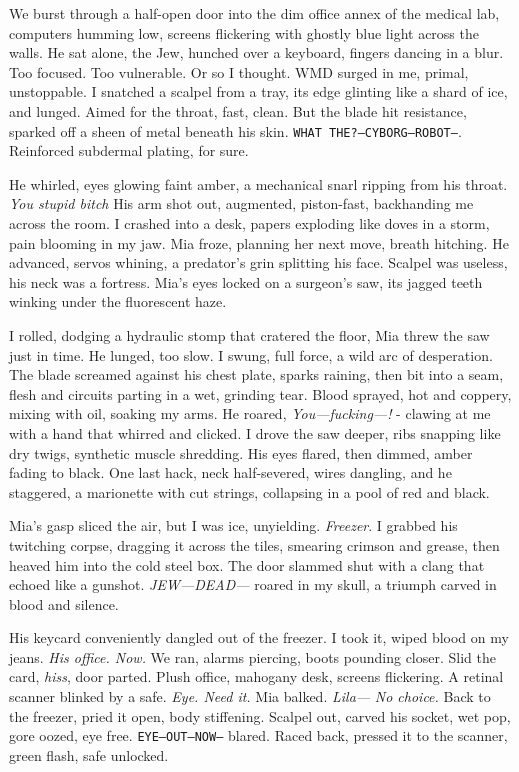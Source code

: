 \documentclass[12pt,oneside]{book}
\newcommand{\note}[1]{\texttt{#1}}
\begin{document}
We burst through a half-open door into the dim office annex of the medical lab, computers humming low, screens flickering with ghostly blue light across the walls. He sat alone, the Jew, hunched over a keyboard, fingers dancing in a blur. Too focused. Too vulnerable. Or so I thought. WMD surged in me, primal, unstoppable. I snatched a scalpel from a tray, its edge glinting like a shard of ice, and lunged. Aimed for the throat, fast, clean. But the blade hit resistance, sparked off a sheen of metal beneath his skin. \note{WHAT THE?—CYBORG—ROBOT—}. Reinforced subdermal plating, for sure.

He whirled, eyes glowing faint amber, a mechanical snarl ripping from his throat. \textit{You stupid bitch} His arm shot out, augmented, piston-fast, backhanding me across the room. I crashed into a desk, papers exploding like doves in a storm, pain blooming in my jaw. Mia froze, planning her next move, breath hitching. He advanced, servos whining, a predator’s grin splitting his face. Scalpel was useless, his neck was a fortress. Mia's eyes locked on a surgeon’s saw, its jagged teeth winking under the fluorescent haze. 

I rolled, dodging a hydraulic stomp that cratered the floor, Mia threw the saw just in time. He lunged, too slow. I swung, full force, a wild arc of desperation. The blade screamed against his chest plate, sparks raining, then bit into a seam, flesh and circuits parting in a wet, grinding tear. Blood sprayed, hot and coppery, mixing with oil, soaking my arms. He roared, \textit{You—fucking—!} - clawing at me with a hand that whirred and clicked. I drove the saw deeper, ribs snapping like dry twigs, synthetic muscle shredding. His eyes flared, then dimmed, amber fading to black. One last hack, neck half-severed, wires dangling, and he staggered, a marionette with cut strings, collapsing in a pool of red and black.

Mia’s gasp sliced the air, but I was ice, unyielding. \textit{Freezer}. I grabbed his twitching corpse, dragging it across the tiles, smearing crimson and grease, then heaved him into the cold steel box. The door slammed shut with a clang that echoed like a gunshot. \textit{JEW—DEAD—} roared in my skull, a triumph carved in blood and silence.

His keycard conveniently dangled out of the freezer. I took it, wiped blood on my jeans. \textit{His office. Now.} We ran, alarms piercing, boots pounding closer. Slid the card, \textit{hiss}, door parted. Plush office, mahogany desk, screens flickering. A retinal scanner blinked by a safe. 
\textit{Eye. Need it.} Mia balked. \textit{Lila—} 
\textit{No choice.} Back to the freezer, pried it open, body stiffening. Scalpel out, carved his socket, wet pop, gore oozed, eye free. \note{EYE—OUT—NOW—} blared. Raced back, pressed it to the scanner, green flash, safe unlocked.
\end{document}
